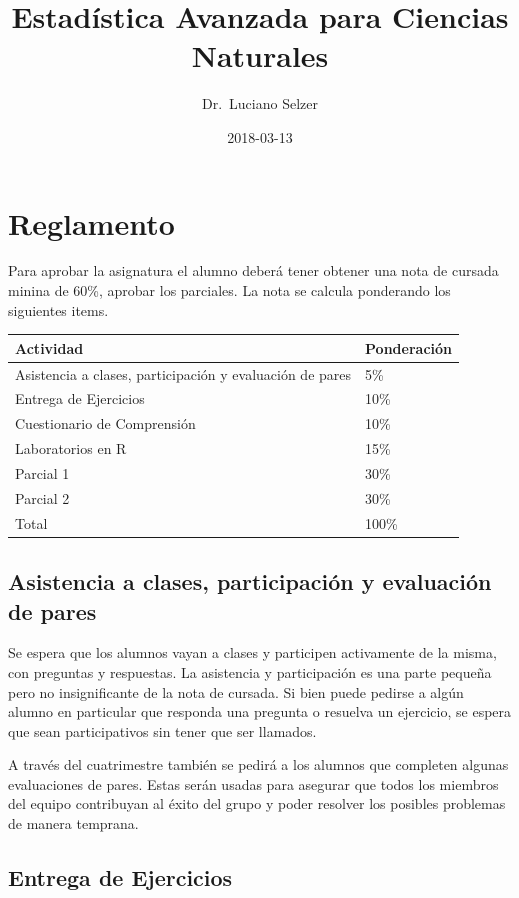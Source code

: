\documentclass[]{book}
\title{Estadística Avanzada para Ciencias Naturales}
\author{Dr.~Luciano Selzer}
\date{2018-03-13}
\theoremstyle{definition}
\theoremstyle{definition}
\theoremstyle{definition}
\theoremstyle{remark}
\begin{document}
\maketitle

{
\setcounter{tocdepth}{1}
\tableofcontents
}
\hypertarget{reglamento}{%
\chapter{Reglamento}\label{reglamento}}

Para aprobar la asignatura el alumno deberá tener obtener una nota de
cursada minina de 60\%, aprobar los parciales. La nota se calcula
ponderando los siguientes items.

\begin{longtable}[]{@{}ll@{}}
\toprule
Actividad & Ponderación\tabularnewline
\midrule
\endhead
Asistencia a clases, participación y evaluación de pares &
5\%\tabularnewline
Entrega de Ejercicios & 10\%\tabularnewline
Cuestionario de Comprensión & 10\%\tabularnewline
Laboratorios en R & 15\%\tabularnewline
Parcial 1 & 30\%\tabularnewline
Parcial 2 & 30\%\tabularnewline
Total & 100\%\tabularnewline
\bottomrule
\end{longtable}

\hypertarget{asistencia-a-clases-participacion-y-evaluacion-de-pares}{%
\section{Asistencia a clases, participación y evaluación de
pares}\label{asistencia-a-clases-participacion-y-evaluacion-de-pares}}

Se espera que los alumnos vayan a clases y participen activamente de la
misma, con preguntas y respuestas. La asistencia y participación es una
parte pequeña pero no insignificante de la nota de cursada. Si bien
puede pedirse a algún alumno en particular que responda una pregunta o
resuelva un ejercicio, se espera que sean participativos sin tener que
ser llamados.

A través del cuatrimestre también se pedirá a los alumnos que completen
algunas evaluaciones de pares. Estas serán usadas para asegurar que
todos los miembros del equipo contribuyan al éxito del grupo y poder
resolver los posibles problemas de manera temprana.

\hypertarget{entrega-de-ejercicios}{%
\section{Entrega de Ejercicios}\label{entrega-de-ejercicios}}
\end{document}
